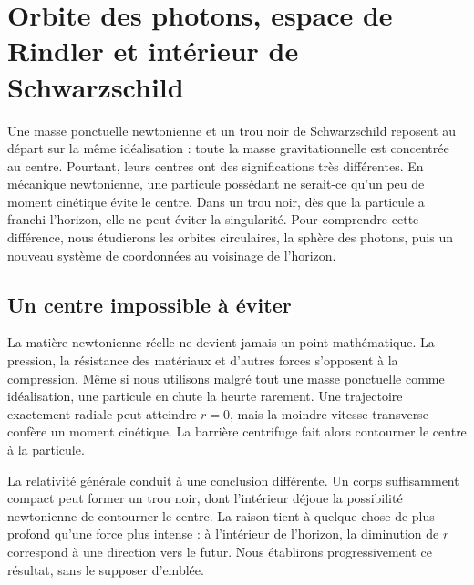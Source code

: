 \chapter{Orbite des photons, espace de Rindler et intérieur de Schwarzschild}

Une masse ponctuelle newtonienne et un trou noir de Schwarzschild reposent au départ sur la même idéalisation : toute la masse gravitationnelle est concentrée au centre. Pourtant, leurs centres ont des significations très différentes. En mécanique newtonienne, une particule possédant ne serait-ce qu’un peu de moment cinétique évite le centre. Dans un trou noir, dès que la particule a franchi l’horizon, elle ne peut éviter la singularité. Pour comprendre cette différence, nous étudierons les orbites circulaires, la sphère des photons, puis un nouveau système de coordonnées au voisinage de l’horizon.

\section{Un centre impossible à éviter}

La matière newtonienne réelle ne devient jamais un point mathématique. La pression, la résistance des matériaux et d’autres forces s’opposent à la compression. Même si nous utilisons malgré tout une masse ponctuelle comme idéalisation, une particule en chute la heurte rarement. Une trajectoire exactement radiale peut atteindre \(r=0\), mais la moindre vitesse transverse confère un moment cinétique. La barrière centrifuge fait alors contourner le centre à la particule.

La relativité générale conduit à une conclusion différente. Un corps suffisamment compact peut former un trou noir, dont l’intérieur déjoue la possibilité newtonienne de contourner le centre. La raison tient à quelque chose de plus profond qu’une force plus intense : à l’intérieur de l’horizon, la diminution de \(r\) correspond à une direction vers le futur. Nous établirons progressivement ce résultat, sans le supposer d’emblée.

\begin{classroomqa}
\end{classroomqa}

